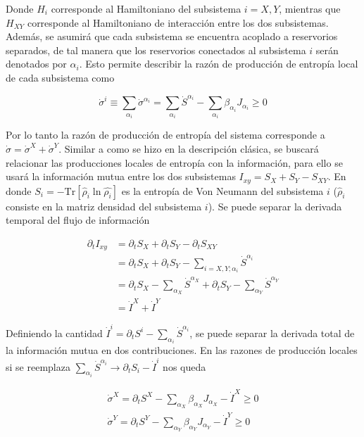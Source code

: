 Donde $H_{i}$ corresponde al Hamiltoniano del subsistema $i=X,Y$, mientras que $H_{XY}$ corresponde al Hamiltoniano de interacción entre los dos subsistemas. Además, se asumirá que cada subsistema se encuentra acoplado a reservorios separados, de tal manera que los reservorios conectados al subsistema $i$ serán denotados por $\alpha_{i}$. Esto permite describir la razón de producción de entropía local de cada subsistema como

\begin{equation*}
    \dot{\sigma}^{i} \equiv \sum_{\alpha_{i}} \dot{\sigma}^{\alpha_{i}} = \sum_{\alpha_{i}} \dot{S}^{\alpha_{i}} - \sum_{\alpha_{i}} \beta_{\alpha_{i}} J_{\alpha_{i}} \geq 0
\end{equation*}

Por lo tanto la razón de producción de entropía del sistema corresponde a $\dot{\sigma} = \dot{\sigma}^{X} + \dot{\sigma}^{Y}$. Similar a como se hizo en la descripción clásica, se buscará relacionar las producciones locales de entropía con la información, para ello se usará la información mutua entre los dos subsistemas $I_{xy} = S_{X} + S_{Y} - S_{XY}$. En donde $S_{i} = - \text{Tr}[ \hat{\rho}_{i}\ln \hat{\rho_{i}}]$ es la entropía de Von Neumann del subsistema $i$ ($\hat{\rho}_{i}$ consiste en la matriz densidad del subsistema $i$). Se puede separar la derivada temporal del flujo de información

\begin{align*}
    \partial_{t}I_{xy} & = \partial_{t}S_{X} + \partial_{t}S_{Y} - \partial_{t}S_{XY} \\
        & = \partial_{t}S_{X} + \partial_{t}S_{Y} - \sum_{i=X,Y;\alpha_{i}}\dot{S}^{\alpha_{i}} \\
        & =  \partial_{t}S_{X} - \sum_{\alpha_{X}} \dot{S}^{\alpha_{X}} + \partial_{t}S_{Y} - \sum_{\alpha_{Y}} \dot{S}^{\alpha_{Y}} \\
        & = \dot{I}^{X} + \dot{I}^{Y}
\end{align*}

Definiendo la cantidad $\dot{I}^{i} = \partial_{t}S^{i} - \sum_{\alpha_{i}} \dot{S}^{\alpha_{i}} $, se puede separar la derivada total de la información mutua en dos contribuciones. En las razones de producción locales si se reemplaza $\sum_{\alpha_{i}}\dot{S}^{\alpha_{i}} \to \partial_{t}S_{i} - \dot{I}^{i} $ nos queda 

\begin{align*}
    \dot{\sigma}^{X} = \partial_{t}S^{X} - \sum_{\alpha_{X}} \beta_{\alpha_{X}} J_{\alpha_{X}} - \dot{I}^{X} \geq 0 \\
    \dot{\sigma}^{Y} = \partial_{t}S^{Y} - \sum_{\alpha_{Y}} \beta_{\alpha_{Y}} J_{\alpha_{Y}} - \dot{I}^{Y} \geq 0
\end{align*}

